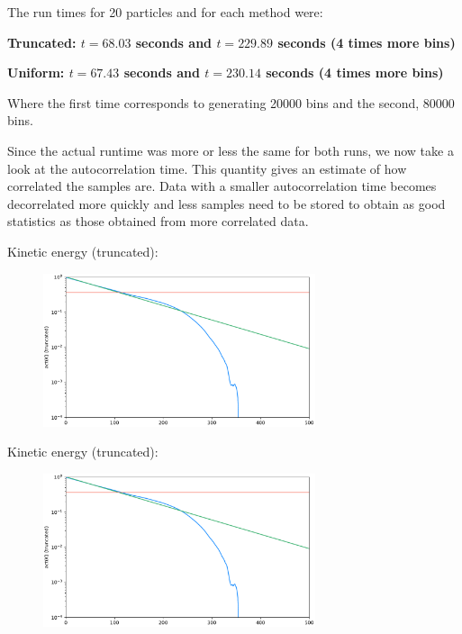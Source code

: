 \documentclass[12pt, two sided]{article}
\begin{document}

The run times for 20 particles and for each method were:

\textbf{Truncated: $t = 68.03$ seconds and $t = 229.89$ seconds (4 times more bins)}

\textbf{Uniform: $t = 67.43$ seconds and $t = 230.14$ seconds (4 times more bins)}

Where the first time corresponds to generating 20000 bins and the second, 80000 bins.

Since the actual runtime was more or less the same for both runs, we now take a look at the autocorrelation time. This quantity gives an estimate of how correlated the samples are. Data with a smaller autocorrelation time becomes decorrelated more quickly and less samples need to be stored to obtain as good statistics as those obtained from more correlated data.

Kinetic energy (truncated):

\begin{figure}[h!]
\includegraphics[width=8cm]{../figures/Act_kinetic_truncated.pdf}
\end{figure}

Kinetic energy (truncated):

\begin{figure}[h!]
\includegraphics[width=8cm]{../figures/Act_kinetic_truncated.pdf}
\end{figure}
\end{document}
